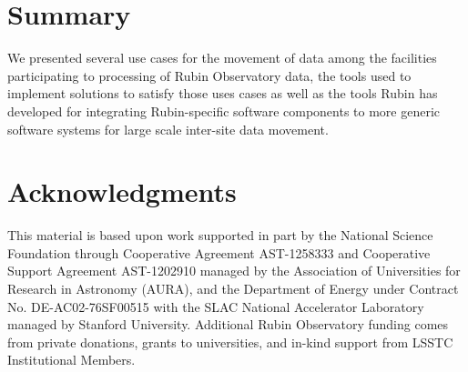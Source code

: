\documentclass{webofc}
\begin{document}
\section{Summary}
\label{summary}
We presented several use cases for the movement of data among the facilities participating to processing of Rubin Observatory data, the tools used to implement solutions to satisfy those uses cases as well as the tools Rubin has developed for integrating Rubin-specific software components to more generic software systems for large scale inter-site data movement.

\section{Acknowledgments}

This material is based upon work supported in part by the National Science Foundation through Cooperative Agreement AST-1258333 and Cooperative Support Agreement AST-1202910 managed by the Association of Universities for Research in Astronomy (AURA), and the Department of Energy under Contract No. DE-AC02-76SF00515 with the SLAC National Accelerator Laboratory managed by Stanford University. Additional Rubin Observatory funding comes from private donations, grants to universities, and in-kind support from LSSTC Institutional Members.


\end{document}
